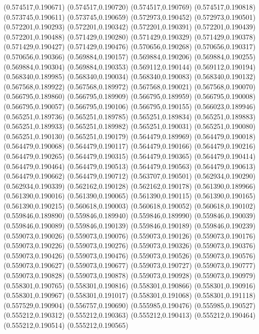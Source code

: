 (0.574517,0.190671)
(0.574517,0.190720)
(0.574517,0.190769)
(0.574517,0.190818)
(0.573745,0.190611)
(0.573745,0.190659)
(0.572973,0.190452)
(0.572973,0.190501)
(0.572201,0.190293)
(0.572201,0.190342)
(0.572201,0.190391)
(0.572201,0.190439)
(0.572201,0.190488)
(0.571429,0.190280)
(0.571429,0.190329)
(0.571429,0.190378)
(0.571429,0.190427)
(0.571429,0.190476)
(0.570656,0.190268)
(0.570656,0.190317)
(0.570656,0.190366)
(0.569884,0.190157)
(0.569884,0.190206)
(0.569884,0.190255)
(0.569884,0.190304)
(0.569884,0.190353)
(0.569112,0.190144)
(0.569112,0.190194)
(0.568340,0.189985)
(0.568340,0.190034)
(0.568340,0.190083)
(0.568340,0.190132)
(0.567568,0.189922)
(0.567568,0.189972)
(0.567568,0.190021)
(0.567568,0.190070)
(0.566795,0.189860)
(0.566795,0.189909)
(0.566795,0.189959)
(0.566795,0.190008)
(0.566795,0.190057)
(0.566795,0.190106)
(0.566795,0.190155)
(0.566023,0.189946)
(0.565251,0.189736)
(0.565251,0.189785)
(0.565251,0.189834)
(0.565251,0.189883)
(0.565251,0.189933)
(0.565251,0.189982)
(0.565251,0.190031)
(0.565251,0.190080)
(0.565251,0.190130)
(0.565251,0.190179)
(0.564479,0.189969)
(0.564479,0.190018)
(0.564479,0.190068)
(0.564479,0.190117)
(0.564479,0.190166)
(0.564479,0.190216)
(0.564479,0.190265)
(0.564479,0.190315)
(0.564479,0.190365)
(0.564479,0.190414)
(0.564479,0.190464)
(0.564479,0.190513)
(0.564479,0.190563)
(0.564479,0.190613)
(0.564479,0.190662)
(0.564479,0.190712)
(0.563707,0.190501)
(0.562934,0.190290)
(0.562934,0.190339)
(0.562162,0.190128)
(0.562162,0.190178)
(0.561390,0.189966)
(0.561390,0.190016)
(0.561390,0.190065)
(0.561390,0.190115)
(0.561390,0.190165)
(0.561390,0.190215)
(0.560618,0.190003)
(0.560618,0.190052)
(0.560618,0.190102)
(0.559846,0.189890)
(0.559846,0.189940)
(0.559846,0.189990)
(0.559846,0.190039)
(0.559846,0.190089)
(0.559846,0.190139)
(0.559846,0.190189)
(0.559846,0.190239)
(0.559073,0.190026)
(0.559073,0.190076)
(0.559073,0.190126)
(0.559073,0.190176)
(0.559073,0.190226)
(0.559073,0.190276)
(0.559073,0.190326)
(0.559073,0.190376)
(0.559073,0.190426)
(0.559073,0.190476)
(0.559073,0.190526)
(0.559073,0.190576)
(0.559073,0.190627)
(0.559073,0.190677)
(0.559073,0.190727)
(0.559073,0.190777)
(0.559073,0.190828)
(0.559073,0.190878)
(0.559073,0.190928)
(0.559073,0.190979)
(0.558301,0.190765)
(0.558301,0.190816)
(0.558301,0.190866)
(0.558301,0.190916)
(0.558301,0.190967)
(0.558301,0.191017)
(0.558301,0.191068)
(0.558301,0.191118)
(0.557529,0.190904)
(0.556757,0.190690)
(0.555985,0.190476)
(0.555985,0.190527)
(0.555212,0.190312)
(0.555212,0.190363)
(0.555212,0.190413)
(0.555212,0.190464)
(0.555212,0.190514)
(0.555212,0.190565)
